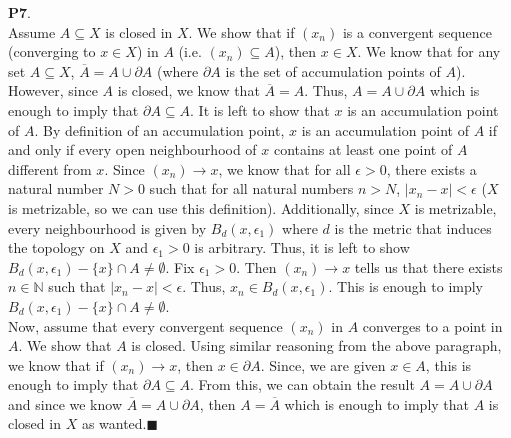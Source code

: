 \documentclass{article}
\begin{document}
    \textbf{P7}.\\
    Assume $A\subseteq X$ is closed in $X$. We show that if $(x_n)$ is a convergent sequence (converging to $x\in X$) in $A$ (i.e. $(x_n)\subseteq A$), 
    then $x\in X$. We know that for any set $A\subseteq X$, $\overline{A} = A \cup \partial{A}$ (where $\partial{A}$ is the set of accumulation points of $A$).
    However, since $A$ is closed, we know that $\overline{A} = A$. Thus, $A = A \cup \partial{A}$ which is enough to imply that $\partial{A} \subseteq A$.
    It is left to show that $x$ is an accumulation point of $A$. By definition of an accumulation point, $x$ is an accumulation point of $A$ if and only if
    every open neighbourhood of $x$ contains at least one point of $A$ different from $x$. Since $(x_n)\to x$, we know that for all $\epsilon>0$, there exists a
    natural number $N > 0$ such that for all natural numbers $n > N$, $|x_n - x| < \epsilon$ ($X$ is metrizable, so we can use this definition). Additionally,
    since $X$ is metrizable, every neighbourhood is given by $B_d(x,\epsilon_1)$ where $d$ is the metric that induces the topology on $X$ and $\epsilon_1>0$ is arbitrary.
    Thus, it is left to show $B_d(x,\epsilon_1) - \{x\} \cap A \neq \emptyset$. Fix $\epsilon_1 > 0$. Then $(x_n)\to x$ tells us that there exists $n\in\mathbb{N}$
    such that $|x_n - x| < \epsilon$. Thus, $x_n \in B_d(x,\epsilon_1)$. This is enough to imply $B_d(x,\epsilon_1) - \{x\} \cap A \neq \emptyset$.\\
    
    Now, assume that every convergent sequence $(x_n)$ in $A$ converges to a point in $A$. We show that $A$ is closed. Using similar reasoning from the above paragraph,
    we know that if $(x_n)\to x$, then $x\in\partial{A}$. Since, we are given $x\in A$, this is enough to imply that $\partial{A}\subseteq A$. From this, we can
    obtain the result $A = A \cup \partial{A}$ and since we know $\overline{A} = A \cup \partial{A}$, then $A = \overline{A}$ which is enough to imply that $A$ is
    closed in $X$ as wanted.\hfill$\blacksquare$\\
\end{document}
